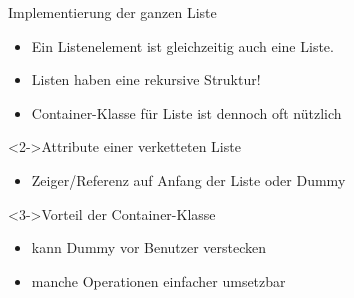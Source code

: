 \begin{frame}
    \begin{block}{Implementierung der ganzen Liste}
        \begin{itemize}
            \item Ein Listenelement ist gleichzeitig auch eine Liste.
            \item \alert{Listen haben eine rekursive Struktur!}
            \item Container-Klasse für Liste ist dennoch oft nützlich
        \end{itemize}
    \end{block}
    \begin{block}<2->{Attribute einer verketteten Liste}
        \begin{itemize}
            \item Zeiger/Referenz auf Anfang der Liste oder Dummy
        \end{itemize}
    \end{block}
    \begin{block}<3->{Vorteil der Container-Klasse}
        \begin{itemize}
            \item kann Dummy vor Benutzer verstecken
            \item manche Operationen einfacher umsetzbar
        \end{itemize}
    \end{block}
\end{frame}
